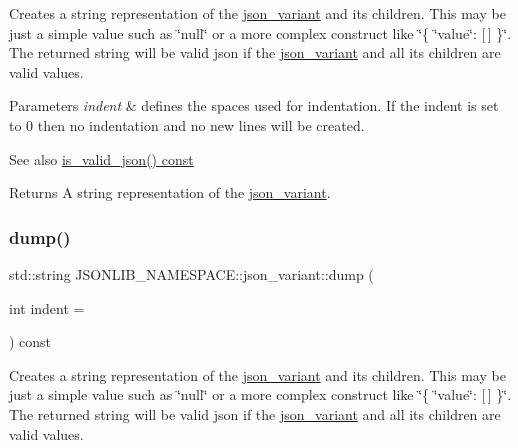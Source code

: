 Creates a string representation of the \hyperlink{classJSONLIB__NAMESPACE_1_1json__variant}{json\+\_\+variant} and its children. This may be just a simple value such as \char`\"{}null\char`\"{} or a more complex construct like \char`\"{}\{ \char`\"{}value\char`\"{}\+: \mbox{[}$\,$\mbox{]} \}\char`\"{}. The returned string will be valid json if the \hyperlink{classJSONLIB__NAMESPACE_1_1json__variant}{json\+\_\+variant} and all its children are valid values. 


\begin{DoxyParams}{Parameters}
{\em indent} & defines the spaces used for indentation. If the indent is set to 0 then no indentation and no new lines will be created. \\
\hline
\end{DoxyParams}
\begin{DoxySeeAlso}{See also}
\hyperlink{classJSONLIB__NAMESPACE_1_1json__variant_a158e3148d9256af3d1b8251b2ca7b6c4}{is\+\_\+valid\+\_\+json() const} 
\end{DoxySeeAlso}
\begin{DoxyReturn}{Returns}
A string representation of the \hyperlink{classJSONLIB__NAMESPACE_1_1json__variant}{json\+\_\+variant}. 
\end{DoxyReturn}
\mbox{\label{classJSONLIB__NAMESPACE_1_1json__variant_a72d4a39d77b76f076354219edc6ea4a0}} 
\subsubsection{\texorpdfstring{dump()}{dump()}\hspace{0.1cm}{\footnotesize\ttfamily [2/2]}}
{\footnotesize\ttfamily std\+::string J\+S\+O\+N\+L\+I\+B\+\_\+\+N\+A\+M\+E\+S\+P\+A\+C\+E\+::json\+\_\+variant\+::dump (\begin{DoxyParamCaption}\item[{int}]{indent = {} }\end{DoxyParamCaption}) const}



Creates a string representation of the \hyperlink{classJSONLIB__NAMESPACE_1_1json__variant}{json\+\_\+variant} and its children. This may be just a simple value such as \char`\"{}null\char`\"{} or a more complex construct like \char`\"{}\{ \char`\"{}value\char`\"{}\+: \mbox{[}$\,$\mbox{]} \}\char`\"{}. The returned string will be valid json if the \hyperlink{classJSONLIB__NAMESPACE_1_1json__variant}{json\+\_\+variant} and all its children are valid values. 


